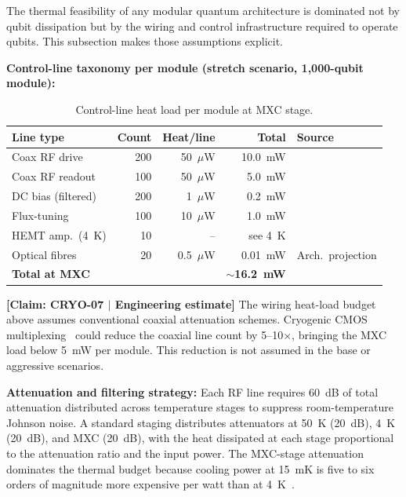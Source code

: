 \documentclass[conference]{IEEEtran}
\begin{document}
The thermal feasibility of any modular quantum architecture is dominated not by qubit dissipation but by the wiring and control infrastructure required to operate qubits. This subsection makes those assumptions explicit.

\textbf{Control-line taxonomy per module (stretch scenario, 1,000-qubit module):}

\begin{table}[H]
\centering
\caption{Control-line heat load per module at MXC stage.}
\label{tab:control-lines}
\footnotesize
\begin{tabularx}{\columnwidth}{L{1.8cm}rrrL{1.8cm}}
\toprule
\textbf{Line type} & \textbf{Count} & \textbf{Heat/line} & \textbf{Total} & \textbf{Source} \\
\midrule
Coax RF drive & 200 & 50~$\mu$W & 10.0~mW & \cite{Krinner2019} \\
Coax RF readout & 100 & 50~$\mu$W & 5.0~mW & \cite{Krinner2019} \\
DC bias (filtered) & 200 & 1~$\mu$W & 0.2~mW & \cite{Reilly2015} \\
Flux-tuning & 100 & 10~$\mu$W & 1.0~mW & \cite{Krinner2019} \\
HEMT amp.\ (4~K) & 10 & -- & see 4~K & \cite{Hornibrook2015} \\
Optical fibres & 20 & 0.5~$\mu$W & 0.01~mW & Arch.\ projection \\
\midrule
\textbf{Total at MXC} & & & \textbf{$\sim$16.2~mW} & \\
\bottomrule
\end{tabularx}
\end{table}

\textbf{[Claim: CRYO-07 $|$ Engineering estimate]} The wiring heat-load budget above assumes conventional coaxial attenuation schemes. Cryogenic CMOS multiplexing~\cite{Bardin2019, Pauka2021} could reduce the coaxial line count by 5--10$\times$, bringing the MXC load below 5~mW per module. This reduction is not assumed in the base or aggressive scenarios.

\textbf{Attenuation and filtering strategy:} Each RF line requires 60~dB of total attenuation distributed across temperature stages to suppress room-temperature Johnson noise. A standard staging distributes attenuators at 50~K (20~dB), 4~K (20~dB), and MXC (20~dB), with the heat dissipated at each stage proportional to the attenuation ratio and the input power. The MXC-stage attenuation dominates the thermal budget because cooling power at 15~mK is five to six orders of magnitude more expensive per watt than at 4~K~\cite{Krinner2019}.
\end{document}
